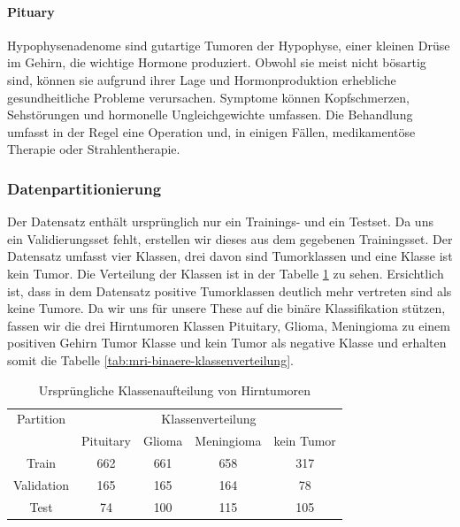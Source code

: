 \paragraph{Pituary}
Hypophysenadenome sind gutartige Tumoren der Hypophyse, einer kleinen Drüse im Gehirn, die wichtige Hormone produziert. Obwohl sie meist nicht bösartig sind, können sie aufgrund ihrer Lage und Hormonproduktion erhebliche gesundheitliche Probleme verursachen. Symptome können Kopfschmerzen, Sehstörungen und hormonelle Ungleichgewichte umfassen. Die Behandlung umfasst in der Regel eine Operation und, in einigen Fällen, medikamentöse Therapie oder Strahlentherapie.

\subsubsection{Datenpartitionierung} \label{chap:Brain-Tumor-Partition}

Der Datensatz enthält ursprünglich nur ein Trainings- und ein Testset. Da uns ein Validierungsset fehlt, erstellen wir dieses aus dem gegebenen Trainingsset. Der Datensatz umfasst vier Klassen, drei davon sind Tumorklassen und eine Klasse ist kein Tumor. Die Verteilung der Klassen ist in der Tabelle \ref{tab:mri-orginale-klassenverteilung} zu sehen. Ersichtlich ist, dass in dem Datensatz positive Tumorklassen deutlich mehr vertreten sind als keine Tumore. Da wir uns für unsere These auf die binäre Klassifikation stützen, fassen wir die drei Hirntumoren Klassen Pituitary, Glioma, Meningioma zu einem positiven Gehirn Tumor Klasse und kein Tumor als negative Klasse und erhalten somit die Tabelle \ref{tab:mri-binaere-klassenverteilung}.

\begin{table}[ht]
\centering
\begin{tabular}{@{}ccccc@{}}
\toprule
 Partition & \multicolumn{4}{c}{Klassenverteilung}        \\ 
\cmidrule(l){2-5}
           & Pituitary & Glioma & Meningioma & kein Tumor \\ 
\midrule 
Train      & 662 & 661 & 658 & 317 \\
Validation & 165 & 165 & 164 & 78  \\
Test       & 74  & 100 & 115 & 105 \\ 
\bottomrule
\end{tabular}
\caption{Ursprüngliche Klassenaufteilung von Hirntumoren}
\label{tab:mri-orginale-klassenverteilung}
\end{table}

